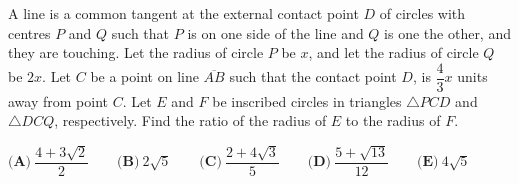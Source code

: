 A line is a common tangent at the external contact point $D$ of circles with centres $P$ and $Q$ such that $P$ is on one side of the line and $Q$ is one the other, and they are touching. Let the radius of circle $P$ be $x$, and let the radius of circle $Q$ be $2x$. Let $C$ be a point on line $\overline{AB}$ such that the contact point $D$, is $\dfrac{4}{3}x$ units away from point $C$. Let $E$ and $F$ be inscribed circles in triangles $\triangle PCD$ and $\triangle DCQ$, respectively. Find the ratio of the radius of $E$ to the radius of $F$.

$\textbf{(A)}~\dfrac{4+3\sqrt{2}}{2}\qquad\textbf{(B)}~2\sqrt{5}\qquad\textbf{(C)}~\dfrac{2+4\sqrt{3}}{5}\qquad\textbf{(D)}~\dfrac{5+\sqrt{13}}{12}\qquad\textbf{(E)}~4\sqrt{5}\qquad$
